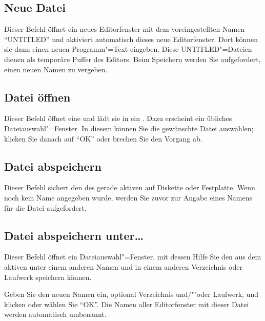 \subsection{Neue Datei}\label{sec:MI_NEW}
Dieser Befehl öffnet ein neues Editorfenster mit dem voreingestellten
Namen "`UNTITLED"' und aktiviert automatisch dieses neue Editorfenster.
Dort können sie dann einen neuen Programm"=Text eingeben. Diese
UNTITLED"=Dateien dienen als temporäre Puffer des Editors.  Beim
Speichern werden Sie aufgefordert, einen neuen Namen zu vergeben.

\subsection{Datei öffnen}
\label{sec:MI_OPEN}

Dieser Befehl öffnet eine 
und lädt sie in ein . Dazu
erscheint ein übliches Dateiauswahl"=Fenster. In diesem können Sie die
gewünschte Datei auswählen; klicken Sie danach auf "`OK"' oder brechen Sie
den Vorgang ab.


\subsection{Datei abspeichern}\label{sec:MI_SAVE}
Dieser Befehl sichert den  des gerade 
aktiven  auf Diskette oder Festplatte. 
Wenn noch kein Name angegeben wurde, werden Sie zuvor zur Angabe 
eines Namens für die Datei aufgefordert.


\subsection{Datei abspeichern unter\dots{}}\label{sec:MI_SAVEAS}

Dieser Befehl öffnet ein Dateiauswahl"=Fenster, mit dessen Hilfe Sie
den  aus dem aktiven
 unter einem anderen Namen und
in einem anderen Verzeichnis oder Laufwerk speichern können.


Geben Sie den neuen Namen ein, optional Verzeichnis und/""oder Laufwerk,
und klicken oder wählen Sie "`OK"'. Die Namen aller Editorfenster mit
dieser Datei werden automatisch umbenannt.


